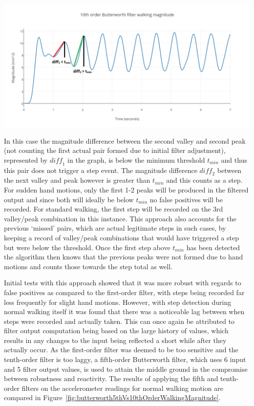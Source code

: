 \documentclass[12pt,a4paper,notitlepage]{report}
\begin{document}
\begin{center}
\includegraphics[scale=0.2]{images/butterworth10thOrderFilterWalkingMagnitudeThreshold.png}
\label{fig:butterworth10thOrderFilterWalkingMagnitudeThreshold}
\end{center}
In this case the magnitude difference between the second valley and second peak (not counting the first actual pair formed due to initial filter adjustment), represented by $\mathit{diff}_1$ in the graph, is below the minimum threshold $t_{min}$ and thus this pair does not trigger a step event. The magnitude difference $\mathit{diff}_2$ between the next valley and peak however is greater than $t_{min}$ and this counts as a step. For sudden hand motions, only the first 1-2 peaks will be produced in the filtered output and since both will ideally be below $t_{min}$ no false positives will be recorded. For standard walking, the first step will be recorded on the 3rd valley/peak combination in this instance. This approach also accounts for the previous `missed' pairs, which are actual legitimate steps in such cases, by keeping a record of valley/peak combinations that would have triggered a step but were below the threshold. Once the first step above $t_{min}$ has been detected the algorithm then knows that the previous peaks were not formed due to hand motions and counts those towards the step total as well. 

Initial tests with this approach showed that it was more robust with regards to false positives as compared to the first-order filter, with steps being recorded far less frequently for slight hand motions. However, with step detection during normal walking itself it was found that there was a noticeable lag between when steps were recorded and actually taken. This can once again be attributed to filter output computation being based on the large history of values, which results in any changes to the input being reflected a short while after they actually occur. As the first-order filter was deemed to be too sensitive and the tenth-order filter is too laggy, a fifth-order Butterworth filter, which uses 6 input and 5 filter output values, is used to attain the middle ground in the compromise between robustness and reactivity. The results of applying the fifth and tenth-order filters on the accelerometer readings for normal walking motion are compared in Figure~\ref{fig:butterworth5thVs10thOrderWalkingMagnitude}.  
\end{document}
